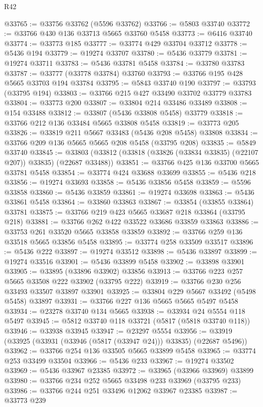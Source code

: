 \begin{lexlean}{R42}
\begin{coremodule}
@33765 := @33756 @33762 (@5596 @33762)
@33766 := @5803 @33740
@33772 := @33766 @430 @136 @33713 @5665 @33760 @5458
@33773 := @6416 @33740
@33774 := @33773 @185
@33777 := @33774 @429 @33704 @33712
@33778 := @5436 @194
@33779 := @19274 @33707
@33780 := @5436 @33779
@33781 := @19274 @33711
@33783 := @5436 @33781 @5458
@33784 := @33780 @33783
@33787 := @33777 (@33778 @33784) @33760
@33793 := @33766 @195 @428 @5665 @33703 @194 @33784
@33795 := @5843 @33740 @190
@33797 := @33793 (@33795 @194)
@33803 := @33766 @215 @427 @33490 @33702 @33779 @33783
@33804 := @33773 @200
@33807 := @33804 @214 @33486 @33489
@33808 := @154 @33488
@33812 := @33807 (@5436 @33808 @5458) @33779
@33818 := @33766 @212 @136 @33484 @5665 @33808 @5458
@33819 := @33773 @205
@33826 := @33819 @211 @5667 @33483 (@5436 @208 @5458) @33808
@33834 := @33766 @209 @136 @5665 @5665 @208 @5458 (@33795 @208)
@33835 := @5849 @33740
@33845 := @33803 (@33812 (@33818 (@33826 (@33834 @33835) (@22107 @207)) @33835) (@22687 @33488))
@33851 := @33766 @425 @136 @33700 @5665 @33781 @5458
@33854 := @33774 @424 @33688 @33699
@33855 := @5436 @218
@33856 := @19274 @33693
@33858 := @5436 @33856 @5458
@33859 := @5596 @33858
@33860 := @5436 @33859
@33861 := @19274 @33698
@33863 := @5436 @33861 @5458
@33864 := @33860 @33863
@33867 := @33854 (@33855 @33864) @33781
@33875 := @33766 @219 @423 @5665 @33687 @218 @33864 (@33795 @218)
@33881 := @33766 @262 @422 @33522 @33686 @33859 @33863
@33886 := @33753 @261 @33520 @5665 @33858 @33859
@33892 := @33766 @259 @136 @33518 @5665 @33856 @5458
@33895 := @33774 @258 @33509 @33517
@33896 := @5436 @222
@33897 := @19274 @33512
@33898 := @5436 @33897
@33899 := @19274 @33516
@33901 := @5436 @33899 @5458
@33902 := @33898 @33901
@33905 := @33895 (@33896 @33902) @33856
@33913 := @33766 @223 @257 @5665 @33508 @222 @33902 (@33795 @222)
@33919 := @33766 @230 @256 @33493 @33507 @33897 @33901
@33925 := @33804 @229 @5667 @33492 (@5498 @5458) @33897
@33931 := @33766 @227 @136 @5665 @5665 @5497 @5458
@33934 := @23278 @33740 @134 @5665
@33938 := @33934 @24 @5554 @118 @5497
@33945 := @5812 @33740 @118 @33721 (@5817 (@5818 @33740 @118))
@33946 := @33938 @33945
@33947 := @23297 @5554
@33956 := @33919 (@33925 (@33931 (@33946 (@5817 (@33947 @24))) @33835) (@22687 @5496))
@33962 := @33766 @254 @136 @33505 @5665 @33899 @5458
@33965 := @33774 @253 @33499 @33504
@33966 := @5436 @233
@33967 := @19274 @33502
@33969 := @5436 @33967 @23385
@33972 := @33965 (@33966 @33969) @33899
@33980 := @33766 @234 @252 @5665 @33498 @233 @33969 (@33795 @233)
@33986 := @33766 @244 @251 @33496 @12062 @33967 @23385
@33987 := @33773 @239

\end{coremodule}
\end{lexlean}
